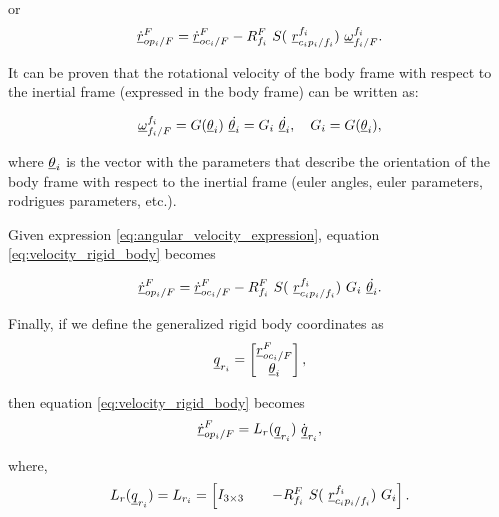 or
\begin{equation}
    \pvec{\dot{r}}{op_{i}}{F}{F} = \pvec{\dot{r}}{oc_{i}}{F}{F} - 
    \rot{R}{f_{i}}{F} \ S( \ \pvec{r}{c_{i}p_{i}}{f_i}{f_i})\ \pvec{\omega}{f_{i}}{F}{f_i}.
    \label{eq:velocity_rigid_body}
\end{equation}

It can be proven that the rotational velocity of the body frame with respect to
the inertial frame (expressed in the body frame) can be written as:

\begin{equation}
    \pvec{\omega}{f_{i}}{F}{f_i} = G(\vecd{\theta}_{i}) \ \dot{\vecd{\theta}_{i}} = 
    G_{i} \ \dot{\vecd{\theta}_{i}}, \quad G_{i} = G(\vecd{\theta}_{i}),  
    \label{eq:angular_velocity_expression}
\end{equation}

where $\underline{\theta}_{i}$ is the vector with the parameters that describe the orientation 
of the body frame with respect to the inertial frame (euler angles, euler parameters,
rodrigues parameters, etc.).

Given expression \eqref{eq:angular_velocity_expression}, equation \eqref{eq:velocity_rigid_body}
becomes    

\[
    \pvec{\dot{r}}{op_{i}}{F}{F} = \pvec{\dot{r}}{oc_{i}}{F}{F} - 
    \rot{R}{f_{i}}{F} \ S( \ \pvec{r}{c_{i}p_{i}}{f_i}{f_i})\ 
    G_{i}\ \dot{\vecd{\theta}_{i}}.
\]

Finally, if we define the generalized rigid body coordinates as 
\begin{equation}
    \vecd{q}_{r_{i}} = \begin{bmatrix}
        \pvec{r}{oc_{i}}{F}{F} \\  \vecd{\theta}_{i}
    \end{bmatrix},
    \label{eq:rigid_body_coordinates}
\end{equation}

then equation \eqref{eq:velocity_rigid_body} becomes
\begin{equation}
    \pvec{\dot{r}}{op_{i}}{F}{F} = L_{r}(\vecd{q}_{r_{i}}) \ \dot{\vecd{q}}_{r_{i}},
    \label{eq:velocity_rigid_body_matrix}
\end{equation}

where,
\begin{equation}
    L_{r}(\vecd{q}_{r_{i}}) = L_{r_i} = \begin{bmatrix}
    I_{3 \times 3} && -\rot{R}{f_{i}}{F} \ S( \ \pvec{r}{c_{i}p_{i}}{f_i}{f_i})\ G_{i}         
    \label{eq:lamda_mat_rigid_body}
    \end{bmatrix}.
\end{equation}

